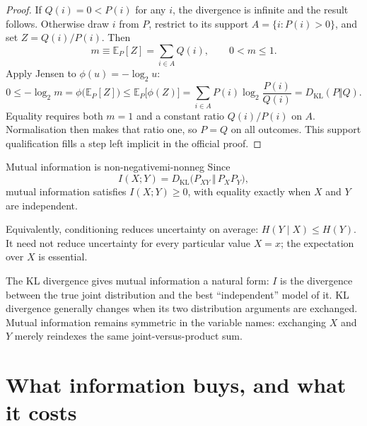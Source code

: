 \begin{proof}
If $Q(i)=0<P(i)$ for any $i$, the divergence is infinite and the result follows. Otherwise draw $i$ from $P$, restrict to its support $A=\{i:P(i)>0\}$, and set $Z=Q(i)/P(i)$. Then
\begin{equation}\label{eq:lec02:gibbs-mean}
m\equiv\mathbb E_P[Z]=\sum_{i\in A}Q(i),\qquad 0<m\leq1.
\end{equation}
Apply Jensen to $\phi(u)=-\log_2u$:
\begin{equation}\label{eq:lec02:gibbs-jensen}
0\leq-\log_2m=\phi\bigl(\mathbb E_P[Z]\bigr)
\leq\mathbb E_P\bigl[\phi(Z)\bigr]
=\sum_{i\in A}P(i)\log_2\frac{P(i)}{Q(i)}
=D_{\mathrm{KL}}(P\Vert Q).
\end{equation}
Equality requires both $m=1$ and a constant ratio $Q(i)/P(i)$ on $A$. Normalisation then makes that ratio one, so $P=Q$ on all outcomes. This support qualification fills a step left implicit in the official proof.
\end{proof}

\begin{corollary}[unbreakable]{Mutual information is non-negative}{mi-nonneg}
Since
\begin{equation}\label{eq:lec02:mi-kl}
I(X;Y)=D_{\mathrm{KL}}\bigl(P_{XY}\,\Vert\,P_XP_Y\bigr),
\end{equation}
mutual information satisfies $I(X;Y)\geq0$, with equality exactly when $X$ and $Y$ are independent.
\end{corollary}
Equivalently, conditioning reduces uncertainty on average: $H(Y\mid X)\leq H(Y)$. It need not reduce uncertainty for every particular value $X=x$; the expectation over $X$ is essential.

\begin{remark}
The KL divergence gives mutual information a natural form: $I$ is the divergence between the true joint distribution and the best ``independent'' model of it. KL divergence generally changes when its two distribution arguments are exchanged. Mutual information remains symmetric in the variable names: exchanging $X$ and $Y$ merely reindexes the same joint-versus-product sum.
\end{remark}

\section{What information buys, and what it costs}\label{sec:lec02:limits}

